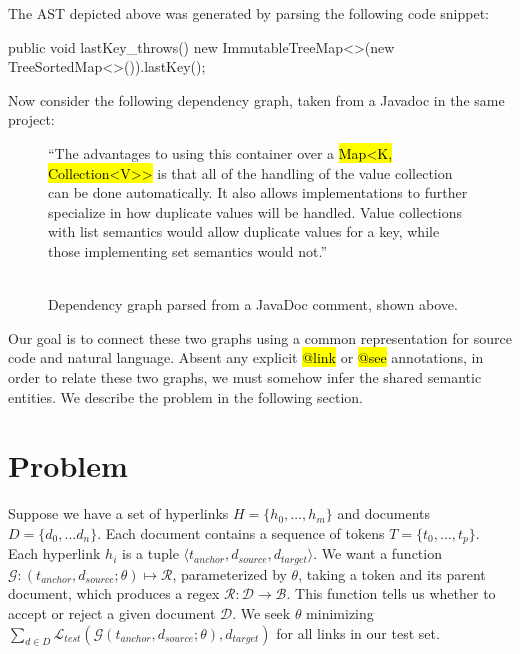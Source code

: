 \documentclass{article}
\newcommand*{\tinline}[1]{{\sethlcolor{slightgray}\ttfamily\footnotesize\relax\hl{#1}}}
\begin{document}
\vspace{-30pt}The AST depicted above was generated by parsing the following code snippet:

\begin{javalisting}
public void lastKey_throws() {
    new ImmutableTreeMap<>(new TreeSortedMap<>()).lastKey();
}
\end{javalisting}

Now consider the following dependency graph, taken from a Javadoc in the same project:

\begin{figure}[H]
``The advantages to using this container over a \footnotesize\tinline{Map<K, Collection<V>{}>} is that all of the handling of the value collection can be done automatically. It also allows implementations to further specialize in how duplicate values will be handled. Value collections with list semantics would allow duplicate values for a key, while those implementing set semantics would not.''\\\\

    \centering
    
    \caption{Dependency graph parsed from a JavaDoc comment, shown above.}
    \label{fig:eng}
\end{figure}

Our goal is to connect these two graphs using a common representation for source code and natural language. Absent any explicit \tinline{@link} or \tinline{@see} annotations, in order to relate these two graphs, we must somehow infer the shared semantic entities. We describe the problem in the following section.

\section{Problem}

Suppose we have a set of hyperlinks $H = \{h_0, \ldots, h_m\}$ and documents $D = \{d_0, \ldots d_n\}$. Each document contains a sequence of tokens $T = \{t_0, \ldots, t_p\}$. Each hyperlink $h_i$ is a tuple $\langle t_{anchor}, d_{source}, d_{target}\rangle$. We want a function $\mathcal G: (t_{anchor}, d_{source}; \theta) \mapsto \mathcal R$, parameterized by $\theta$, taking a token and its parent document, which produces a regex $\mathcal R: \mathcal D \rightarrow \mathcal{B}$. This function tells us whether to accept or reject a given document $\mathcal D$. We seek $\theta$ minimizing $\sum_{d \in D}\mathcal L_{test}(\mathcal G(t_{anchor}, d_{source}; \theta), d_{target})$ for all links in our test set.
\end{document}
